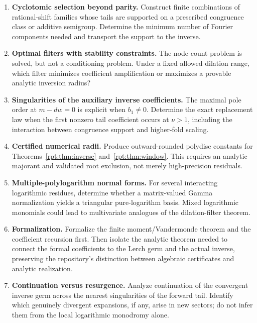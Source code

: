 \documentclass[11pt,a4paper]{article}
\numberwithin{equation}{section}
\theoremstyle{definition}\newtheorem{definition}[theorem]{Definition}
\theoremstyle{remark}\newtheorem{remark}[theorem]{Remark}
\begin{document}
\begin{enumerate}[label=\textbf{Q\arabic*.},leftmargin=2.8em,itemsep=8pt]
\item \textbf{Cyclotomic selection beyond parity.} Construct finite combinations of rational-shift families whose tails are supported on a prescribed congruence class or additive semigroup. Determine the minimum number of Fourier components needed and transport the support to the inverse.

\item \textbf{Optimal filters with stability constraints.} The node-count problem is solved, but not a conditioning problem. Under a fixed allowed dilation range, which filter minimizes coefficient amplification or maximizes a provable analytic inversion radius?

\item \textbf{Singularities of the auxiliary inverse coefficients.} The maximal pole order at $m-dw=0$ is explicit when $b_1\ne0$. Determine the exact replacement law when the first nonzero tail coefficient occurs at $\nu>1$, including the interaction between congruence support and higher-fold scaling.

\item \textbf{Certified numerical radii.} Produce outward-rounded polydisc constants for Theorems~\ref{rpt:thm:inverse} and~\ref{rpt:thm:window}. This requires an analytic majorant and validated root exclusion, not merely high-precision residuals.

\item \textbf{Multiple-polylogarithm normal forms.} For several interacting logarithmic residues, determine whether a matrix-valued Gamma normalization yields a triangular pure-logarithm basis. Mixed logarithmic monomials could lead to multivariate analogues of the dilation-filter theorem.

\item \textbf{Formalization.} Formalize the finite moment/Vandermonde theorem and the coefficient recursion first. Then isolate the analytic theorem needed to connect the formal coefficients to the Lerch germ and the actual inverse, preserving the repository's distinction between algebraic certificates and analytic realization.

\item \textbf{Continuation versus resurgence.} Analyze continuation of the convergent inverse germ across the nearest singularities of the forward tail. Identify which genuinely divergent expansions, if any, arise in new sectors; do not infer them from the local logarithmic monodromy alone.
\end{enumerate}
\end{document}
